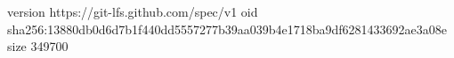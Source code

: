 version https://git-lfs.github.com/spec/v1
oid sha256:13880db0d6d7b1f440dd5557277b39aa039b4e1718ba9df6281433692ae3a08e
size 349700
